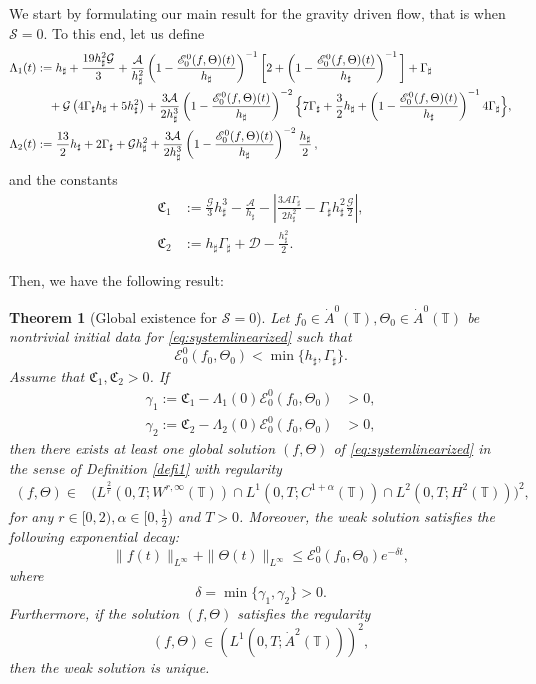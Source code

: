 \documentclass[reqno,11pt]{amsart}
\newcommand{\TT}{{\mathbb T}}
\newcommand{\bh}{h_\sharp}
\newcommand{\bG}{\Gamma_\sharp}
\newtheorem{theorem}{Theorem}
\begin{document}
We start by formulating our main result for the gravity driven flow, that is when $\mathcal S=0$. To this end, let us define
\begin{align}
\Lambda_1(t)&:= \bh+\frac{19\bh^2\mathcal{ G}}{3}+ \frac{\mathcal{A}}{\bh^2}\left(1-\frac{\mathscr{E}_0^0(f,\Theta)(t)}{\bh}\right)^{-1}\bigg{[}2+\left(1-\frac{\mathscr{E}_0^0(f,\Theta)(t)}{\bh}\right)^{-1} \bigg{]}+\bG\nonumber \\ 
&\quad+\mathcal{G}\left(4\bG\bh +5\bh^2\right)+\frac{3\mathcal{A}}{2\bh^3}\left(1-\frac{\mathscr{E}_0^0(f,\Theta)(t)}{\bh}\right)^{-2}\Big\{7\bG + \frac{3}{2}\bh + \left(1-\frac{\mathscr{E}_0^0(f,\Theta)(t)}{\bh}\right)^{-1}4\bG\Big\} \label{eq:Lambda_1},\\
\Lambda_2(t)&:=\frac{13}{2}\bh+2\bG+\mathcal{G}\bh^2+\frac{3\mathcal{A}}{2\bh^3}\left(1-\frac{\mathscr{E}_0^0(f,\Theta)(t)}{\bh}\right)^{-2}\frac{\bh}{2}\label{eq:Lambda_2}\,,
\end{align}
and the constants
\begin{align}
\mathfrak{C}_1&:=\frac{\mathcal{G}}{3}\bh^3-\frac{\mathcal{A}}{\bh}-\left|\frac{3\mathcal{A}\bG}{2\bh^2}-\bG\bh^2\frac{\mathcal{G}}{2}\right|,\label{constant1}\\
\mathfrak{C}_2&:=\bh \bG+\mathcal{D}-\frac{\bh^2}{2}.\label{constant2}
\end{align}


Then, we have the following result:
\begin{theorem}[Global existence for $\mathcal{S}=0$]\label{global1}
Let $f_0\in \dot A^0(\TT), \Theta_0\in \dot A^0(\TT)$ be nontrivial  initial data for \eqref{eq:systemlinearized}
such that
$$
\mathscr{E}^0_0(f_0,\Theta_0)<\min\{\bh,\bG\}.
$$
Assume that $\mathfrak{C}_1,\mathfrak{C}_2>0$. If
\begin{align*}
\gamma_1:=\mathfrak{C}_1-\Lambda_1(0)\mathscr{E}_0^0(f_0,\Theta_0)&>0,\\
\gamma_2:=\mathfrak{C}_2-\Lambda_2(0)\mathscr{E}_0^0(f_0,\Theta_0)&>0,
\end{align*}
then there exists at least one global solution $(f,\Theta)$ of \eqref{eq:systemlinearized} in the sense of Definition \ref{defi1} with regularity
\begin{align*}
(f,\Theta)\in &\Big(L^{\frac{2}{r}}\left(0,T;W^{r,\infty}(\TT)\right)\cap L^1\left(0,T;C^{1+\alpha}(\TT)\right) \cap L^2(0,T;H^2(\TT))\Big)^2,
\end{align*}
for any $r\in[0,2), \alpha\in[0,\frac{1}{2})$ and $T>0$. Moreover, the weak solution satisfies the following exponential decay:
$$
\|f(t)\|_{L^\infty}+\|\Theta(t)\|_{L^\infty}\leq \mathscr{E}^0_0(f_0,\Theta_0)e^{-\delta t},
$$
where 
\begin{equation}\label{delta2}
\delta=\min\{\gamma_1,\gamma_2\}>0.
\end{equation}
Furthermore, if the solution $(f,\Theta)$ satisfies the regularity
$$
(f,\Theta)\in \left(L^1\left(0,T;\dot{A}^2(\TT)\right)\right)^2,
$$
then the weak solution is unique.
\end{theorem}
\end{document}
